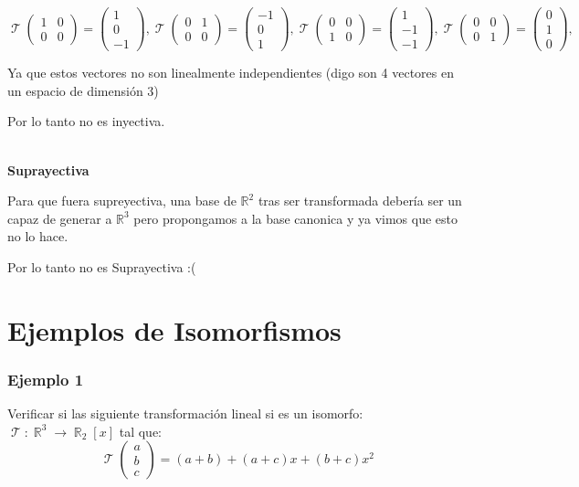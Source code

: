\documentclass[12pt]{report}                                    %
\DeclareMathOperator \Real {\mathbb{R}}                         %
\DeclareMathOperator \LinealTransformation {\mathcal{T}}        %
\newcommand{\pVector}[1]{                                       %
        \ensuremath{\begin{pmatrix}#1\end{pmatrix}}                 %
    }
\begin{document}
            \begin{equation*}
                \LinealTransformation \pVector{1&0\\0&0} = \pVector{1\\0\\-1}, 
                \LinealTransformation \pVector{0&1\\0&0} = \pVector{-1\\0\\1}, 
                \LinealTransformation \pVector{0&0\\1&0} = \pVector{1\\-1\\-1}, 
                \LinealTransformation \pVector{0&0\\0&1} = \pVector{0\\1\\0}, 
            \end{equation*}

            Ya que estos vectores no son linealmente independientes (digo son 4 vectores en un espacio de dimensión 3)

            Por lo tanto no es inyectiva.

            \textbf{\\Suprayectiva}

            Para que fuera supreyectiva, una base de $\mathbb{R}^2$ tras ser transformada debería ser un capaz de
            generar a $\mathbb{R}^3$ pero propongamos a la base canonica y ya vimos que esto no lo hace.

            Por lo tanto no es Suprayectiva :(




    \clearpage
    \section{Ejemplos de Isomorfismos}



            \subsubsection{\large Ejemplo 1}
            Verificar si las siguiente transformación lineal si es un isomorfo:
            $\LinealTransformation : \Real^3 \to \Real_2[x]$ tal que: 
            \begin{equation*}
            \LinealTransformation \pVector{a\\b\\c} = (a+b)+(a+c)x+(b+c)x^2
            \end{equation*}
\end{document}
